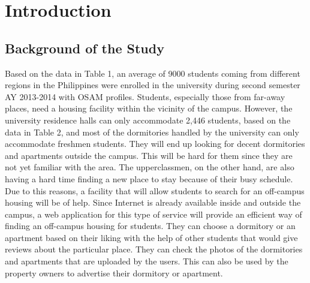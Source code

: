 \documentclass[journal]{./IEEE/IEEEtran}
\title{\SPTITLE}
\author{\ADVISEE~and~\ADVISER%
\REMARK
}
\begin{document}
\maketitle


\section{Introduction}

\subsection{Background of the Study}
Based on the data in Table 1, an average of 9000 students coming from different regions in the Philippines were enrolled in the university during second semester AY 2013-2014 with OSAM profiles. Students, especially those from far-away places, need a housing facility within the vicinity of the campus. However, the university residence halls can only accommodate 2,446 students, based on the data in Table 2, and most of the dormitories handled by the university can only accommodate freshmen students. They will end up looking for decent dormitories and apartments outside the campus. This will be hard for them since they are not yet familiar with the area. The upperclassmen, on the other hand, are also having a hard time finding a new place to stay because of their busy schedule. Due to this reasons, a facility that will allow students to search for an off-campus housing will be of help. Since Internet is already available inside and outside the campus, a web application for this type of service will provide an efficient way of finding an off-campus housing for students. They can choose a dormitory or an apartment based on their liking with the help of other students that would give reviews about the particular place. They can check the photos of the dormitories and apartments that are uploaded by the users. This can also be used by the property owners to advertise their dormitory or apartment.
\end{document}
